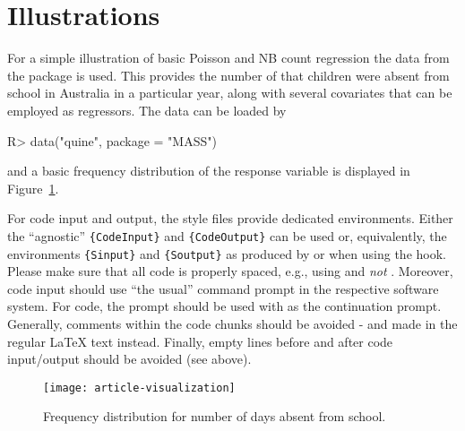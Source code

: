 \documentclass[article, shortnames]{jss}
\newcommand{\fct}[1]{\code{#1()}}
\begin{document}
\iffalse

\section{Illustrations} \label{sec:illustrations}

For a simple illustration of basic Poisson and NB count regression the
 data from the  package is used. This provides the number
of  that children were absent from school in Australia in a
particular year, along with several covariates that can be employed as regressors.
The data can be loaded by
%
\begin{CodeChunk}
\begin{CodeInput}
R> data("quine", package = "MASS")
\end{CodeInput}
\end{CodeChunk}
%
and a basic frequency distribution of the response variable is displayed in
Figure~\ref{fig:quine}.

\begin{leftbar}
For code input and output, the style files provide dedicated environments.
Either the ``agnostic'' \verb|{CodeInput}| and \verb|{CodeOutput}| can be used
or, equivalently, the environments \verb|{Sinput}| and \verb|{Soutput}| as
produced by \fct{Sweave} or  when using the 
hook. Please make sure that all code is properly spaced, e.g., using
 and \emph{not} . Moreover, code input should
use ``the usual'' command prompt in the respective software system. For
 code, the prompt  should be used with  as
the continuation prompt. Generally, comments within the code chunks should be
avoided - and made in the regular {\LaTeX} text instead. Finally, empty lines
before and after code input/output should be avoided (see above).
\end{leftbar}

\begin{figure}[t!]
\centering
\texttt{[image: article-visualization]}
\caption{\label{fig:quine} Frequency distribution for number of days absent
from school.}
\end{figure}
\end{document}
